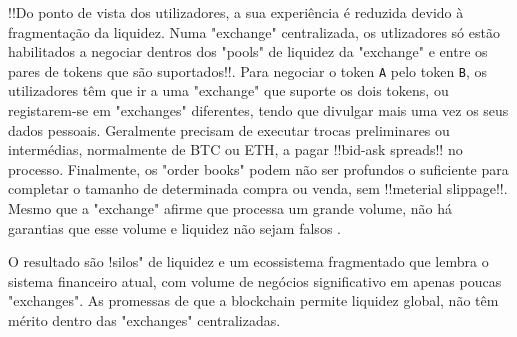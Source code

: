 \documentclass[UTF8,nofonts]{article}
\begin{document}
\begin{multicols}{2}
!!Do ponto de vista dos utilizadores, a sua experiência é reduzida devido à fragmentação da liquidez. Numa "exchange" centralizada, os utlizadores só estão habilitados a negociar dentros dos  "pools" de liquidez da "exchange" e entre os pares de tokens que são suportados!!. Para negociar o token \verb|A| pelo token \verb|B|, os utilizadores têm que ir a uma "exchange" que suporte os dois tokens, ou registarem-se em "exchanges" diferentes, tendo que divulgar mais uma vez os seus dados pessoais. Geralmente precisam de executar trocas preliminares ou intermédias, normalmente de BTC ou ETH, a pagar !!bid-ask spreads!! no processo. Finalmente, os "order books" podem não ser profundos o suficiente para completar o tamanho de determinada compra ou venda, sem !!meterial slippage!!. Mesmo que a "exchange" afirme que processa um grande volume, não há garantias que esse volume e liquidez não sejam falsos \cite{fakevolume}.

O resultado são !silos" de liquidez e um ecossistema fragmentado que lembra o sistema financeiro atual, com volume de negócios significativo em apenas poucas "exchanges". As promessas de que a blockchain permite liquidez global, não têm mérito dentro das "exchanges" centralizadas.


\end{multicols}
\end{document}
